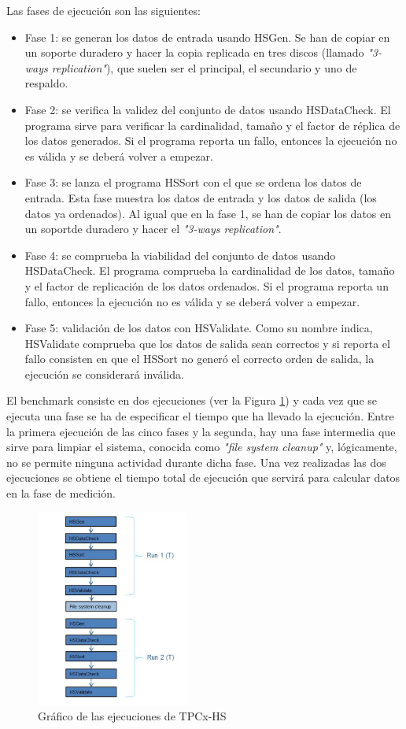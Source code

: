 \documentclass[10pt]{article}
\begin{document}
		Las fases de ejecución son las siguientes:
		
		\begin{itemize}
			\item Fase 1: se generan los datos de entrada usando HSGen. Se han de copiar en un soporte duradero y hacer la copia replicada en tres discos (llamado \textit{"3-ways replication"}), que suelen ser el principal, el secundario y uno de respaldo\cite{replication}.
			\item Fase 2: se verifica la validez del conjunto de datos usando HSDataCheck. El programa sirve para verificar la cardinalidad, tamaño y el factor de réplica de los datos generados. Si el programa reporta un fallo, entonces la ejecución no es válida y se deberá volver a empezar.
			\item Fase 3: se lanza el programa HSSort con el que se ordena los datos de entrada. Esta fase muestra los datos de entrada y los datos de salida (los datos ya ordenados). Al igual que en la fase 1, se han de copiar los datos en un soportde duradero y hacer el \textit{"3-ways replication"}.
			\item Fase 4: se comprueba la viabilidad del conjunto de datos usando HSDataCheck. El programa comprueba la cardinalidad de los datos, tamaño y el factor de replicación de los datos ordenados. Si el programa reporta un fallo, entonces la ejecución no es válida y se deberá volver a empezar.
			\item Fase 5: validación de los datos con HSValidate. Como su nombre indica, HSValidate comprueba que los datos de salida sean correctos y si reporta el fallo consisten en que el HSSort no generó el correcto orden de salida, la ejecución se considerará inválida.
		\end{itemize}
		
		El benchmark consiste en dos ejecuciones (ver la Figura \ref{fig:ejecucionesTPC}) y cada vez que se ejecuta una fase se ha de especificar el tiempo que ha llevado la ejecución. Entre la primera ejecución de las cinco fases y la segunda, hay una fase intermedia que sirve para limpiar el sistema, conocida como \textit{"file system cleanup"} y, lógicamente, no se permite ninguna actividad durante dicha fase. Una vez realizadas las dos ejecuciones se obtiene el tiempo total de ejecución que servirá para calcular datos en la fase de medición.
		
		\begin{figure}[h]
			\centering
			\includegraphics[width=5cm]{./images/executionsTPC.png}
			\caption{Gráfico de las ejecuciones de TPCx-HS} 
			\label{fig:ejecucionesTPC}
		\end{figure}
		
\end{document}
